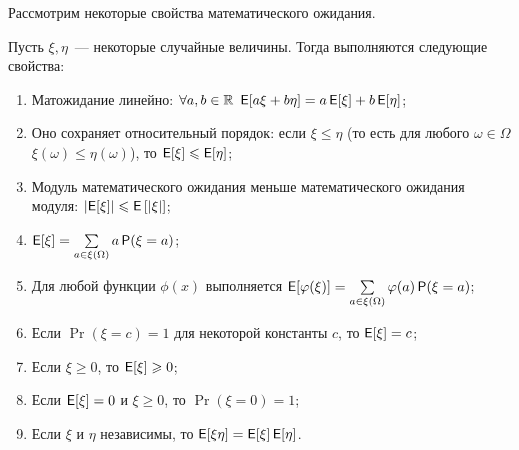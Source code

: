 Рассмотрим некоторые свойства математического ожидания.
\begin{theorem}
    Пусть \(\xi, \eta\)~--- некоторые случайные величины. Тогда выполняются следующие свойства:
    \begin{enumerate}
        \item Матожидание линейно: \(\forall a, b \in \R\ \E[a\xi + b\eta] = a\E[\xi] + b\E[\eta]\);
        \item Оно сохраняет относительный порядок: если \(\xi \leq \eta\) (то есть для любого \(\omega \in \Omega\) \(\xi(\omega) \leq \eta(\omega)\)), то \(\E[\xi] \leq \E[\eta]\);
        \item Модуль математического ожидания меньше математического ожидания модуля: \(\left|\E[\xi]\right| \leq \E\left[|\xi\right|]\);
        \item \(\E[\xi] = \sum\limits_{a \in \xi(\Omega)} a\Pr(\xi = a)\);
        \item Для любой функции \(\phi(x)\) выполняется \(\E[\phi(\xi)] = \sum\limits_{a \in \xi(\Omega)} \phi(a)\Pr(\xi = a)\);
        \item Если \(\Pr(\xi = c) = 1\) для некоторой константы \(c\), то \(\E[\xi] = c\);
        \item Если \(\xi \geq 0\), то \(\E[\xi] \geq 0\); 
        \item Если \(\E[\xi] = 0\) и \(\xi \geq 0\), то \(\Pr(\xi = 0) = 1\);
        \item Если \(\xi\) и \(\eta\) независимы, то \(\E[\xi\eta] = \E[\xi]\E[\eta]\).
    \end{enumerate}
\end{theorem}
